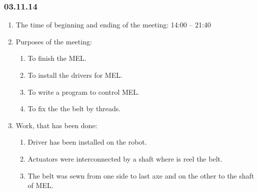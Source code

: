 	
\subsubsection{03.11.14}

\begin{enumerate}
	\item The time of beginning and ending of the meeting:
	14:00 – 21:40
	\item Purposes of the meeting:
	\begin{enumerate}
	  \item	To finish the MEL.
	  
	  \item To install the drivers for MEL.
	  
	  \item To	write a program to control MEL.
	  
	  \item To fix the the belt by threads.
	  
    \end{enumerate}
    
	\item Work, that has been done:
	\begin{enumerate}
	  \item	Driver has been installed on the robot.
      
      \item	Actuators were interconnected by a shaft where is reel the belt.
      
      \item	The belt was sewn from one side to last axe and on the other to the shaft of MEL.
      

\end{enumerate}
\end{enumerate}
